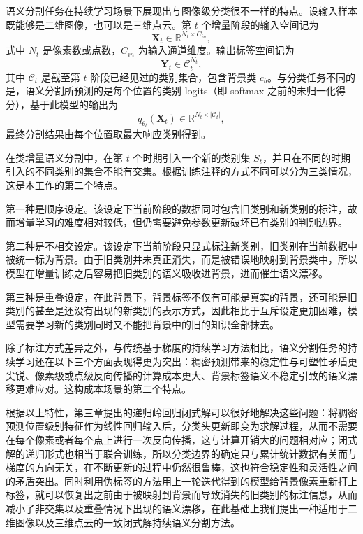 语义分割任务在持续学习场景下展现出与图像级分类很不一样的特点。设输入样本既能够是二维图像，也可以是三维点云。第 $t$ 个增量阶段的输入空间记为
\begin{equation}
\mathbf{X}_t \in \mathbb{R}^{N_t \times C_{in}},
\end{equation}
式中 $N_t$ 是像素数或点数，$C_{in}$ 为输入通道维度。输出标签空间记为
\begin{equation}
\mathbf{Y}_t \in \mathcal{C}_t^{N_t},
\end{equation}
其中 $\mathcal{C}_t$ 是截至第 $t$ 阶段已经见过的类别集合，包含背景类 $c_b$。与分类任务不同的是，语义分割所预测的是每个位置的类别 logits（即 softmax 之前的未归一化得分），基于此模型的输出为
\begin{equation}
q_{\theta_t}(\mathbf{X}_t) \in \mathbb{R}^{N_t \times |\mathcal{C}_t|},
\end{equation}
最终分割结果由每个位置取最大响应类别得到。

在类增量语义分割中，在第 $t$ 个时期引入一个新的类别集 $S_t$，并且在不同的时期引入的不同类别的集合不能有交集。根据训练注释的方式不同可以分为三类情况，这是本工作的第二个特点。

第一种是顺序设定。该设定下当前阶段的数据同时包含旧类别和新类别的标注，故而增量学习的难度相对较低，但仍需要避免参数更新破坏已有类别的判别边界。

第二种是不相交设定。该设定下当前阶段只显式标注新类别，旧类别在当前数据中被统一标为背景。由于旧类别并未真正消失，而是被错误地映射到背景类中，所以模型在增量训练之后容易把旧类别的语义吸收进背景，进而催生语义漂移。

第三种是重叠设定，在此背景下，背景标签不仅有可能是真实的背景，还可能是旧类别的甚至是还没有出现的新类别的表示方式，因此相比于互斥设定更加困难，模型需要学习新的类别同时又不能把背景中的旧的知识全部抹去。

除了标注方式差异之外，与传统基于梯度的持续学习方法相比，语义分割任务的持续学习还在以下三个方面表现得更为突出：稠密预测带来的稳定性与可塑性矛盾更尖锐、像素级或点级反向传播的计算成本更大、背景标签语义不稳定引致的语义漂移更难应对。这构成本场景的第二个特点。

根据以上特性，第三章提出的递归岭回归闭式解可以很好地解决这些问题：将稠密预测位置级别特征作为线性回归输入后，分类头更新即变为求解过程，从而不需要在每个像素或者每个点上进行一次反向传播，这与计算开销大的问题相对应；闭式解的递归形式也相当于联合训练，所以分类边界的确定只与累计统计数据有关而与梯度的方向无关，在不断更新的过程中仍然很鲁棒，这也符合稳定性和灵活性之间的矛盾突出。同时利用伪标签的方法用上一轮迭代得到的模型给背景像素重新打上标签，就可以恢复出之前由于被映射到背景而导致消失的旧类别的标注信息，从而减小了非交集以及重叠情况下出现的语义漂移，在此基础上我们提出一种适用于二维图像以及三维点云的一致闭式解持续语义分割方法。

